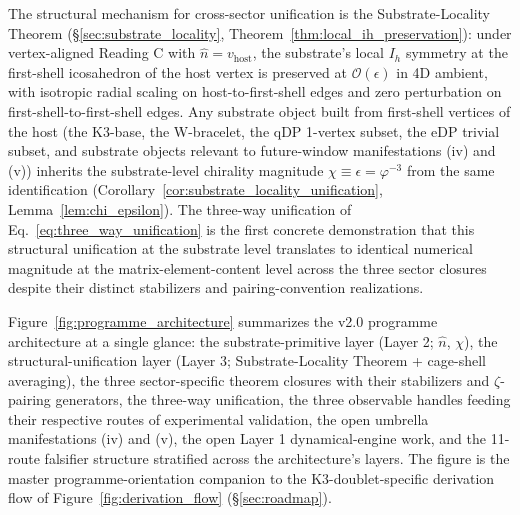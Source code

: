 \documentclass[11pt,letterpaper]{article}
\newcommand{\phig}{\varphi}
\begin{document}
The structural mechanism for cross-sector unification is the Substrate-Locality Theorem (\S\ref{sec:substrate_locality}, Theorem~\ref{thm:local_ih_preservation}): under vertex-aligned Reading C with $\hat{n} = v_{\text{host}}$, the substrate's local $I_h$ symmetry at the first-shell icosahedron of the host vertex is preserved at $\mathcal{O}(\epsilon)$ in 4D ambient, with isotropic radial scaling on host-to-first-shell edges and zero perturbation on first-shell-to-first-shell edges. Any substrate object built from first-shell vertices of the host (the K3-base, the W-bracelet, the qDP 1-vertex subset, the eDP trivial subset, and substrate objects relevant to future-window manifestations (iv) and (v)) inherits the substrate-level chirality magnitude $\chi \equiv \epsilon = \phig^{-3}$ from the same identification (Corollary~\ref{cor:substrate_locality_unification}, Lemma~\ref{lem:chi_epsilon}). The three-way unification of Eq.~\eqref{eq:three_way_unification} is the first concrete demonstration that this structural unification at the substrate level translates to identical numerical magnitude at the matrix-element-content level across the three sector closures despite their distinct stabilizers and pairing-convention realizations.

Figure~\ref{fig:programme_architecture} summarizes the v2.0 programme architecture at a single glance: the substrate-primitive layer (Layer 2; $\hat{n}$, $\chi$), the structural-unification layer (Layer 3; Substrate-Locality Theorem + cage-shell averaging), the three sector-specific theorem closures with their stabilizers and $\zeta$-pairing generators, the three-way unification, the three observable handles feeding their respective routes of experimental validation, the open umbrella manifestations (iv) and (v), the open Layer 1 dynamical-engine work, and the 11-route falsifier structure stratified across the architecture's layers. The figure is the master programme-orientation companion to the K3-doublet-specific derivation flow of Figure~\ref{fig:derivation_flow} (\S\ref{sec:roadmap}).
\end{document}
